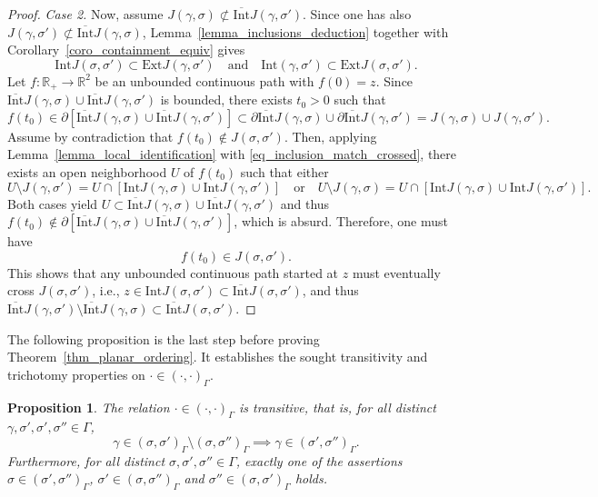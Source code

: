 \documentclass[a4paper, 11pt]{article} %
\theoremstyle{plain}
\newtheorem{proposition}[theorem]{Proposition}
\newcommand{\Int}{\mathrm{Int}}
\newcommand{\clInt}{\overline{\mathrm{Int}}}
\newcommand{\Ext}{\mathrm{Ext}}
\newcommand{\R}{\mathbb{R}}
\newcommand{\1}{\mathds 1}
\numberwithin{equation}{section}
\begin{document}
\begin{proof}
    \emph{Case 2.} Now, assume $J(\gamma,\sigma)\not\subset \clInt J(\gamma,\sigma')$. Since one has also $J(\gamma,\sigma')\not\subset\clInt J(\gamma,\sigma)$, Lemma~\ref{lemma_inclusions_deduction} together with Corollary~\ref{coro_containment_equiv} gives
        \begin{equation}
            \label{eq_inclusion_match_crossed}
            \Int J(\sigma,\sigma')\subset\Ext J(\gamma,\sigma')\quad\text{and}\quad \Int(\gamma,\sigma')\subset\Ext J(\sigma,\sigma').
        \end{equation}
    Let $f:\R_+\to\R^2$ be an unbounded continuous path with $f(0)=z$. Since $\clInt J(\gamma,\sigma)\cup\clInt J(\gamma,\sigma')$ is bounded, there exists $t_0>0$ such that
        \[f(t_0)\in\partial[\clInt J(\gamma,\sigma)\cup\clInt J(\gamma,\sigma')]\subset\partial\clInt J(\gamma,\sigma)\cup\partial\clInt J(\gamma,\sigma')=J(\gamma,\sigma)\cup J(\gamma,\sigma').\]
    Assume by contradiction that $f(t_0)\notin J(\sigma,\sigma')$. Then, applying Lemma~\ref{lemma_local_identification} with \eqref{eq_inclusion_match_crossed}, there exists an open neighborhood $U$ of $f(t_0)$ such that either
        \[U\setminus J(\gamma,\sigma')=U\cap[\Int J(\gamma,\sigma)\cup\Int J(\gamma,\sigma')]\quad\text{or}\quad U\setminus J(\gamma,\sigma)=U\cap[\Int J(\gamma,\sigma)\cup\Int J(\gamma,\sigma')].\]
    Both cases yield $U\subset\clInt J(\gamma,\sigma)\cup\clInt J(\gamma,\sigma')$ and thus $f(t_0)\notin\partial[\clInt J(\gamma,\sigma)\cup\clInt J(\gamma,\sigma')]$, which is absurd. Therefore, one must have
        \[f(t_0)\in J(\sigma,\sigma').\]
    This shows that any unbounded continuous path started at $z$ must eventually cross $J(\sigma,\sigma')$, i.e., $z\in\Int J(\sigma,\sigma')\subset\clInt J(\sigma,\sigma')$, and thus $\clInt J(\gamma,\sigma')\setminus\clInt J(\gamma,\sigma)\subset\clInt J(\sigma,\sigma')$.
\end{proof}


The following proposition is the last step before proving Theorem~\ref{thm_planar_ordering}. It establishes the sought transitivity and trichotomy properties on $\cdot\in(\cdot,\cdot)_\Gamma$.


\begin{proposition}
    \label{prop_transitive_and_trichotomy}
    The relation $\cdot\in(\cdot,\cdot)_\Gamma$ is \emph{transitive}, that is, for all distinct $\gamma,\sigma',\sigma',\sigma''\in\Gamma$,
        \[\gamma\in(\sigma,\sigma')_\Gamma\setminus(\sigma,\sigma'')_\Gamma\implies\gamma\in (\sigma',\sigma'')_\Gamma.\]
    Furthermore, for all distinct $\sigma,\sigma',\sigma''\in\Gamma$, exactly one of the assertions $\sigma\in(\sigma',\sigma'')_\Gamma$, $\sigma'\in(\sigma,\sigma'')_\Gamma$ and $\sigma''\in(\sigma,\sigma')_\Gamma$ holds.
\end{proposition}
\end{document}
